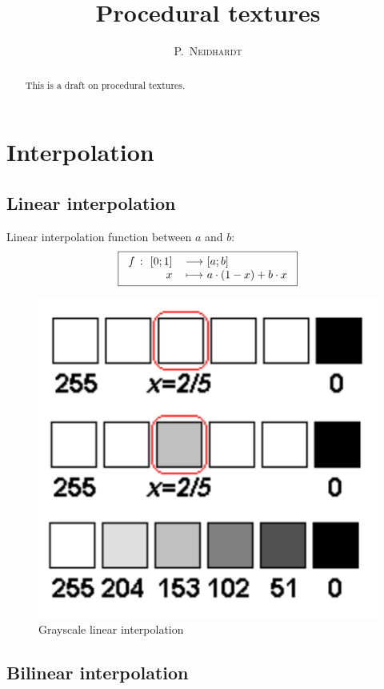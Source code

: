 \documentclass[10pt,a4paper]{article}
\title{Procedural textures}
\author{\textsc{P.~Neidhardt}}
\newcommand{\function}[5]{
  \begin{tabular}{rl}
    #1 $\colon$ #2 & $\longrightarrow$ #3 \\
    #4             & $\longmapsto$     #5
  \end{tabular}
}
\begin{document}
\maketitle

\begin{abstract}
  This is a draft on procedural textures.
\end{abstract}

\vfill
\thispagestyle{empty}
\tableofcontents

\section{Interpolation}

\subsection{Linear interpolation}

Linear interpolation function between $a$ and $b$:
\[
\boxed{
  \function {$f$} {$[0;1]$} {$[a;b]$} {$x$} {$a \cdot (1-x) + b \cdot x$}
}
\]

\begin{figure}[p]
  \centering
  \caption{Grayscale linear interpolation}
  \bigskip
  \includegraphics[scale=0.8]{pictures/interpolation}
\end{figure}

\subsection{Bilinear interpolation}
\end{document}
